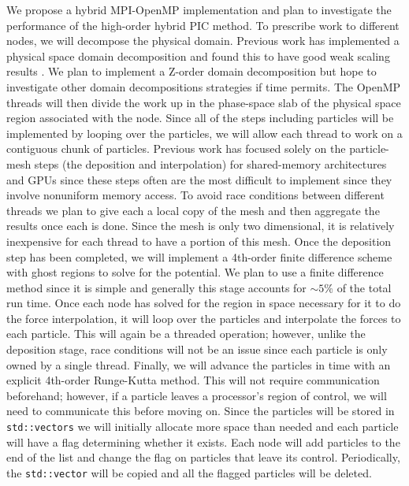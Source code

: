 \documentclass[aps,12pt, notitlepage]{revtex4-1}
\renewcommand{\=}[1]{\overline{#1}}
\begin{document}
We propose a hybrid MPI-OpenMP implementation and plan to investigate the performance of the high-order hybrid PIC method. 
To prescribe work to different nodes, we will decompose the physical domain. Previous work has implemented a physical space domain decomposition and found this to have good weak scaling results \cite{wang2011particle}.
We plan to implement a Z-order domain decomposition but hope to investigate other domain decompositions strategies if time permits. 
The OpenMP threads will then divide the work up in the phase-space slab of the physical space region associated with the node.
Since all of the steps including particles will be implemented by looping over the particles, we will allow each thread to work on a contiguous chunk of particles.  
Previous work has focused solely on the particle-mesh steps (the deposition and interpolation) for shared-memory architectures \cite{madduri2012optimization} and GPUs \cite{stantchev2008fast, buyukkecceci2013portable} since these steps often are the most difficult to implement since they involve nonuniform memory access. 
To avoid race conditions between different threads we plan to give each a local copy of the mesh and then aggregate the results once each is done. 
Since the mesh is only two dimensional, it is relatively inexpensive for each thread to have a portion of this mesh. 
Once the deposition step has been completed, we will implement a 4th-order finite difference scheme with ghost regions to solve for the potential.
We plan to use a finite difference method since it is simple and generally this stage accounts for $\sim 5\%$ of the total run time. 
Once each node has solved for the region in space necessary for it to do the force interpolation, it will loop over the particles and interpolate the forces to each particle.
This will again be a threaded operation; however, unlike the deposition stage, race conditions will not be an issue since each particle is only owned by a single thread. 
Finally, we will advance the particles in time with an explicit 4th-order Runge-Kutta method.
This will not require communication beforehand; however, if a particle leaves a processor's region of control, we will need to communicate this before moving on. 
Since the particles will be stored in \texttt{std::vectors} we will initially allocate more space than needed and each particle will have a flag determining whether it exists. 
Each node will add particles to the end of the list and change the flag on particles that leave its control.  
Periodically, the \texttt{std::vector} will be copied and all the flagged particles will be deleted. 
\end{document}
